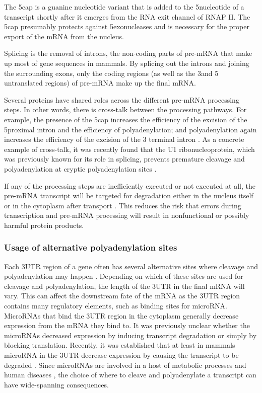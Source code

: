 The 5\p cap is a guanine nucleotide variant that is added to the 5\p nucleotide
of a transcript shortly after it emerges from the RNA exit channel of RNAP II.
The 5\p cap presumably protects against 5\p exonucleases and is necessary for
the proper export of the mRNA from the nucleus.

Splicing is the removal of introns, the non-coding parts of pre-mRNA that make
up most of gene sequences in mammals. By splicing out the introns and joining
the surrounding exons, only the coding regions (as well as the 3\p and 5\p
untranslated regions) of pre-mRNA make up the final mRNA.

Several proteins have shared roles across the different pre-mRNA processing
steps. In other words, there is cross-talk between the processing pathways. For
example, the presence of the 5\p cap increases the efficiency of the excision
of the 5\p proximal intron and the efficiency of polyadenylation; and
polyadenylation again increases the efficiency of the excision of the 3\p
terminal intron \cite{proudfoot_integrating_2002}. As a concrete example of
cross-talk, it was recently found that the U1 ribonucleoprotein, which was
previously known for its role in splicing, prevents premature cleavage and
polyadenylation at cryptic polyadenylation sites \cite{kaida_u1_2010}.

If any of the processing steps are inefficiently executed or not executed at
all, the pre-mRNA transcript will be targeted for degradation either in the
nucleus itself or in the cytoplasm after transport \cite{doma_rna_2007}. This
reduces the risk that errors during transcription and pre-mRNA processing will
result in nonfunctional or possibly harmful protein products.

\subsubsection{Usage of alternative polyadenylation sites}
Each 3\p UTR region of a gene often has several alternative sites where
cleavage and polyadenylation may happen \cite{tian_large-scale_2005}. Depending
on which of these sites are used for cleavage and polyadenylation, the length
of the 3\p UTR in the final mRNA will vary. This can affect the downstream fate
of the mRNA as the 3\p UTR region contains many regulatory elements, such as
binding sites for microRNA. MicroRNAs that bind the 3\p UTR region in the
cytoplasm generally decrease expression from the mRNA they bind to. It was
previously unclear whether the microRNAs decreased expression by inducing
transcript degradation or simply by blocking translation. Recently, it was
established that at least in mammals microRNA in the 3\p UTR decrease
expression by causing the transcript to be degraded
\cite{huntzinger_gene_2011}. Since microRNAs are involved in a host of
metabolic processes and human diseases \cite{huang_biological_2010}, the choice
of where to cleave and polyadenylate a transcript can have wide-spanning
consequences.

